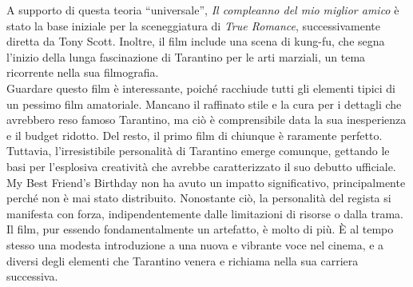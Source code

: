 \documentclass[12pt]{article} %
\begin{document}
\begin{flushleft}
A supporto di questa teoria “universale”, \textit{Il compleanno del mio miglior amico} è stato la base iniziale per la sceneggiatura di \textit{True Romance}, successivamente diretta da Tony Scott. Inoltre, il film include una scena di kung-fu, che segna l’inizio della lunga fascinazione di Tarantino per le arti marziali, un tema ricorrente nella sua filmografia.
\\\vspace{1cm}
Guardare questo film è interessante, poiché racchiude tutti gli elementi tipici di un pessimo film amatoriale. Mancano il raffinato stile e la cura per i dettagli che avrebbero reso famoso Tarantino, ma ciò è comprensibile data la sua inesperienza e il budget ridotto. Del resto, il primo film di chiunque è raramente perfetto. Tuttavia, l’irresistibile personalità di Tarantino emerge comunque, gettando le basi per l’esplosiva creatività che avrebbe caratterizzato il suo debutto ufficiale. My Best Friend's Birthday non ha avuto un impatto significativo, principalmente perché non è mai stato distribuito. Nonostante ciò, la personalità del regista si manifesta con forza, indipendentemente dalle limitazioni di risorse o dalla trama. Il film, pur essendo fondamentalmente un artefatto, è molto di più. È al tempo stesso una modesta introduzione a una nuova e vibrante voce nel cinema, e a diversi degli elementi che Tarantino venera e richiama nella sua carriera successiva.
\end{flushleft}
\break
\end{document}
